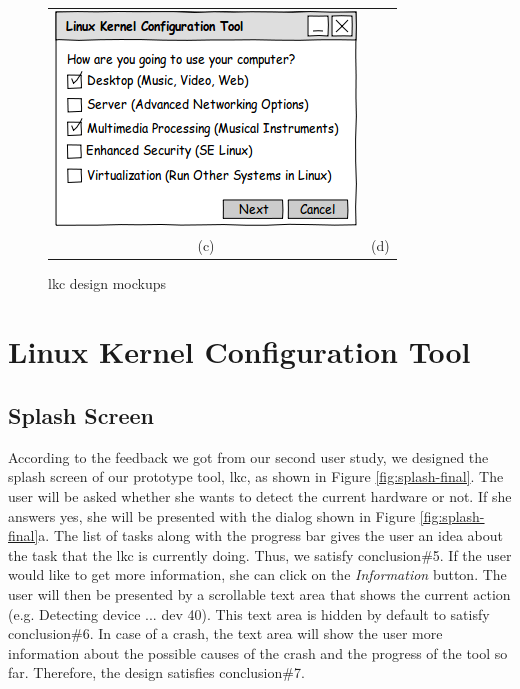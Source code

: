 \documentclass{chi2009}
\begin{document}
\begin{figure}[!t]
\begin{tabular}{SS}
 \includegraphics[scale=0.5,keepaspectratio=true]{figs/lkc-wizard} \\
 (c) & (d) \\
\end{tabular}
\caption{\textsf{lkc} design mockups}
\label{fig:lkc-tool}
\end{figure}

\section{Linux Kernel Configuration Tool}\label{sec:lkc}

\subsection{Splash Screen}
According to the feedback we got from our second user study, we designed the splash screen of our prototype tool, \textsf{lkc}, as shown in Figure
\ref{fig:splash-final}. The user will be asked whether she wants to detect the current hardware or not. If she answers yes, she will be presented with the
dialog shown in Figure \ref{fig:splash-final}a. The list of tasks along with the progress bar gives the user an idea about the task that the \textsf{lkc} is
currently doing. Thus, we satisfy conclusion\#5. If the user would like to get more information, she can click on the \textit{Information} button. The user will
then be presented by a scrollable text area that shows the current action (e.g. Detecting device ... dev 40). This text area is hidden by default to satisfy
conclusion\#6. In case of a crash, the text area will show the user more information about the possible causes of the crash and the progress of the tool so far.
Therefore, the design satisfies conclusion\#7.
\end{document}
